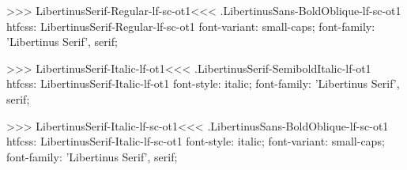 {{>>>
\<LibertinusSerif-Regular-lf-sc-ot1\><<<
.LibertinusSans-BoldOblique-lf-sc-ot1
htfcss:  LibertinusSerif-Regular-lf-sc-ot1  font-variant: small-caps; font-family: 'Libertinus Serif', serif;

>>>
\<LibertinusSerif-Italic-lf-ot1\><<<
.LibertinusSerif-SemiboldItalic-lf-ot1
htfcss:  LibertinusSerif-Italic-lf-ot1  font-style: italic; font-family: 'Libertinus Serif', serif;

>>>
\<LibertinusSerif-Italic-lf-sc-ot1\><<<
.LibertinusSans-BoldOblique-lf-sc-ot1
htfcss:  LibertinusSerif-Italic-lf-sc-ot1  font-style: italic; font-variant: small-caps; font-family: 'Libertinus Serif', serif;

}}
